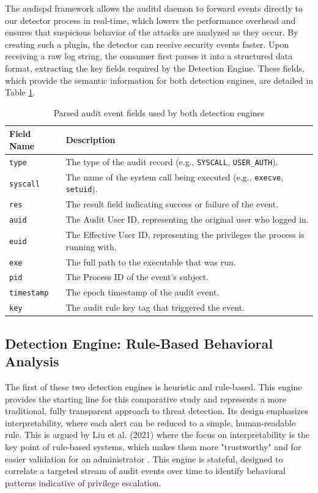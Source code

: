 \documentclass[journal]{./IEEEtran}
\begin{document}
The audispd framework allows the auditd daemon to forward events directly to our detector process in real-time, which lowers the performance overhead and ensures that suspicious behavior of the attacks are analyzed as they occur. By creating such a plugin, the detector can receive security events faster. Upon receiving a raw log string, the consumer first parses it into a structured data format, extracting the key fields required by the Detection Engine. These fields, which provide the semantic information for both detection engines, are detailed in Table \ref{tab:audit_fields}.

\begin{table}[h]
    \centering
    \caption{Parsed audit event fields used by both detection engines}
    \begin{tabular}{|l|p{6cm}|}
        \hline
        \textbf{Field Name} & \textbf{Description} \\ \hline
        \texttt{type} & The type of the audit record (e.g., \texttt{SYSCALL}, \texttt{USER\_AUTH}). \\ \hline
        \texttt{syscall} & The name of the system call being executed (e.g., \texttt{execve}, \texttt{setuid}). \\ \hline
        \texttt{res} & The result field indicating success or failure of the event. \\ \hline
        \texttt{auid} & The Audit User ID, representing the original user who logged in. \\ \hline
        \texttt{euid} & The Effective User ID, representing the privileges the process is running with. \\ \hline
        \texttt{exe} & The full path to the executable that was run. \\ \hline
        \texttt{pid} & The Process ID of the event's subject. \\ \hline
        \texttt{timestamp} & The epoch timestamp of the audit event. \\ \hline
        \texttt{key} & The audit rule key tag that triggered the event. \\ \hline
    \end{tabular}
    \label{tab:audit_fields}
\end{table}

\subsection{Detection Engine: Rule-Based Behavioral Analysis}
The first of these two detection engines is heuristic and rule-based. This engine provides the starting line for this comparative study and represents a more traditional, fully transparent approach to threat detection. Its design emphasizes interpretability, where each alert can be reduced to a simple, human-readable rule. This is argued by Liu et al. (2021) where the focus on interpretability is the key point of rule-based systems, which makes them more "trustworthy" and for easier validation for an administrator \cite{liu2021}. This engine is stateful, designed to correlate a targeted stream of audit events over time to identify behavioral patterns indicative of privilege escalation.
\end{document}
